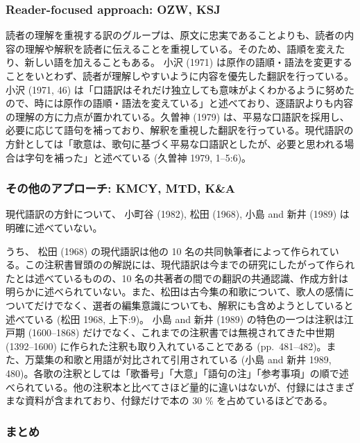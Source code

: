 \documentclass[
  letterpaper,
  DIV=11,
  numbers=noendperiod]{scrartcl}
\begin{document}
\subsubsection*{Reader-focused approach: OZW,
KSJ}\label{reader-focused-approach-ozw-ksj}

読者の理解を重視する訳のグループは、原文に忠実であることよりも、読者の内容の理解や解釈を読者に伝えることを重視している。そのため、語順を変えたり、新しい語を加えることもある。
小沢 (1971)
は原作の語順・語法を変更することをいとわず、読者が理解しやすいように内容を優先した翻訳を行っている。
小沢 (1971, 46)
は「口語訳はそれだけ独立しても意味がよくわかるように努めたので、時には原作の語順・語法を変えている」と述べており、逐語訳よりも内容の理解の方に力点が置かれている。久曽神
(1979)
は、平易な口語訳を採用し、必要に応じて語句を補っており、解釈を重視した翻訳を行っている。現代語訳の方針としては「歌意は、歌句に基づく平易な口語訳としたが、必要と思われる場合は字句を補った」と述べている
(久曽神 1979, 1--5:6)。

\subsubsection*{その他のアプローチ: KMCY, MTD,
K\&A}\label{ux305dux306eux4ed6ux306eux30a2ux30d7ux30edux30fcux30c1-kmcy-mtd-ka}

現代語訳の方針について、 小町谷 (1982), 松田 (1968), 小島 and 新井
(1989) は明確に述べていない。

うち、 松田 (1968) の現代語訳は他の 10
名の共同執筆者によって作られている。この注釈書冒頭のの解説には、現代語訳は今までの研究にしたがって作られたとは述べているものの、10
名の共著者の間での翻訳の共通認識、作成方針は明らかに述べられていない。また、松田は古今集の和歌について、歌人の感情についてだけでなく、選者の編集意識についても、解釈にも含めようとしていると述べている
(松田 1968, 上下:9)。 小島 and 新井 (1989) の特色の一つは注釈は江戸期
(1600--1868) だけでなく、これまでの注釈書では無視されてきた中世期
(1392--1600) に作られた注釈も取り入れていることである
(pp.~481--482)。また、万葉集の和歌と用語が対比されて引用されている (小島
and 新井 1989,
480)。各歌の注釈としては「歌番号」「大意」「語句の注」「参考事項」の順で述べられている。他の注釈本と比べてさほど量的に違いはないが、付録にはさまざまな資料が含まれており、付録だけで本の
30 \% を占めているほどである。

\subsubsection*{まとめ}\label{ux307eux3068ux3081}
\end{document}
